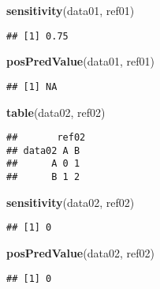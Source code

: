 \documentclass[]{article}
\newenvironment{Shaded}{\begin{snugshade}}{\end{snugshade}}
\newcommand{\KeywordTok}[1]{\textcolor[rgb]{0.13,0.29,0.53}{\textbf{#1}}}
\newcommand{\NormalTok}[1]{#1}
\begin{document}
\begin{Shaded}
\begin{Highlighting}[]
\KeywordTok{sensitivity}\NormalTok{(data01, ref01) }
\end{Highlighting}
\end{Shaded}

\begin{verbatim}
## [1] 0.75
\end{verbatim}

\begin{Shaded}
\begin{Highlighting}[]
\KeywordTok{posPredValue}\NormalTok{(data01, ref01) }
\end{Highlighting}
\end{Shaded}

\begin{verbatim}
## [1] NA
\end{verbatim}

\begin{Shaded}
\begin{Highlighting}[]
\KeywordTok{table}\NormalTok{(data02, ref02)}
\end{Highlighting}
\end{Shaded}

\begin{verbatim}
##       ref02
## data02 A B
##      A 0 1
##      B 1 2
\end{verbatim}

\begin{Shaded}
\begin{Highlighting}[]
\KeywordTok{sensitivity}\NormalTok{(data02, ref02) }
\end{Highlighting}
\end{Shaded}

\begin{verbatim}
## [1] 0
\end{verbatim}

\begin{Shaded}
\begin{Highlighting}[]
\KeywordTok{posPredValue}\NormalTok{(data02, ref02) }
\end{Highlighting}
\end{Shaded}

\begin{verbatim}
## [1] 0
\end{verbatim}
\end{document}
